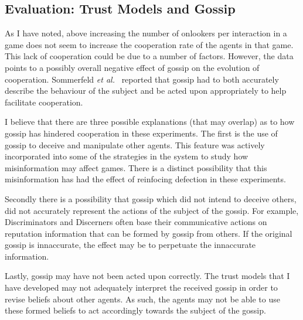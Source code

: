 \documentclass[]{final_report}
\begin{document}
\subsection{Evaluation: Trust Models and Gossip}
As I have noted, above increasing the number of onlookers per interaction in a game does not seem to increase the cooperation rate of the agents in that game. This lack of cooperation could be due to a number of factors. However, the data points to a possibly overall negative effect of gossip on the evolution of cooperation. Sommerfeld \textit{et al.}~\cite{gossip_alt} reported that gossip had to both accurately describe the behaviour of the subject and be acted upon appropriately to help facilitate cooperation.\par 
I believe that there are three possible explanations (that may overlap) as to how gossip has hindered cooperation in these experiments. The first is the use of gossip to deceive and manipulate other agents. This feature was actively incorporated into some of the strategies in the system to study how misinformation may affect games. There is a distinct possibility that this misinformation has had the effect of reinfocing defection in these experiments.\par 
Secondly there is a possibility that gossip which did not intend to deceive others, did not accurately represent the actions of the subject of the gossip. For example, Discriminators and Discerners often base their communicative actions on reputation information that can be formed by gossip from others. If the original gossip is innaccurate, the effect may be to perpetuate the innaccurate information.\par 
Lastly, gossip may have not been acted upon correctly. The trust models that I have developed may not adequately interpret the received gossip in order to revise beliefs about other agents. As such, the agents may not be able to use these formed beliefs to act accordingly towards the subject of the gossip.
\end{document}
